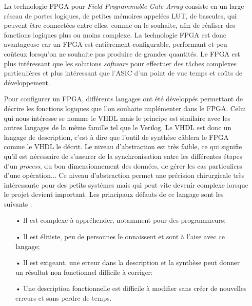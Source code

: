 \documentclass[a4paper,12pt]{article}
\begin{document}
La technologie FPGA pour \textit{Field Programmable Gate Array} consiste en un large réseau de portes logiques, de petites mémoires appelées LUT, de bascules, qui peuvent être connectées entre elles, comme on le souhaite, afin de réaliser des fonctions logiques plus ou moins complexe. La technologie FPGA est donc avantageuse car un FPGA est entièrement configurable, performant et peu coûteux lorsqu'on ne souhaite pas produire de grandes quantités. Le FPGA est plus intéressant que les solutions \textit{software} pour effectuer des tâches complexes particulières et plus intéressant que l'ASIC d'un point de vue temps et coûts de développement.\newline 

Pour configurer un FPGA, différents langages ont été développés permettant de décrire les fonctions logiques que l'on souhaite implémenter dans le FPGA. Celui qui nous intéresse se nomme le VHDL mais le principe est similaire avec les autres langages de la même famille tel que le Verilog. Le VHDL est donc un langage de description, c'est à dire que l'outil de synthèse câblera le FPGA comme le VHDL le décrit. Le niveau d'abstraction est très faible, ce qui signifie qu'il est nécessaire de s'assurer de la synchronisation entre les différentes étapes d'un \textit{process}, du bon dimensionnement des données, de gérer les cas particuliers d'une opération... Ce niveau d'abstraction permet une précision chirurgicale très intéressante pour des petits systèmes mais qui peut vite devenir complexe lorsque le projet devient important. Les principaux défauts de ce langage sont les suivants :
\begin{itemize}
\item[•] Il est complexe à appréhender, notamment pour des programmeurs;
\item[•] Il est élitiste, peu de personnes le onnaissent et sont à l'aise avec ce langage;
\item[•] Il est exigeant, une erreur dans la description et la synthèse peut donner un résultat non fonctionnel difficile à corriger;
\item[•] Une description fonctionnelle est difficile à modifier sans créer de nouvelles erreurs et sans perdre de temps.
\end{itemize}
\end{document}
